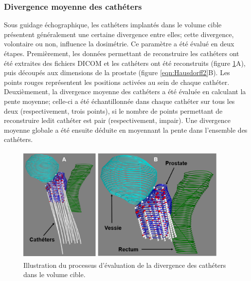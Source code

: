 \subsubsection{Divergence moyenne des cathéters}
Sous guidage échographique, les cathéters implantés dans le volume cible présentent généralement une certaine divergence entre elles; cette divergence, volontaire ou non, influence la dosimétrie. Ce paramètre a été évalué en deux étapes. Premièrement, les données permettant de reconstruire les cathéters ont été extraites des fichiers DICOM et les cathéters ont été reconstruits (figure \ref{Catheters}A), puis découpés aux dimensions de la prostate (figure \ref{eqn:Hausdorff2}B). Les points rouges représentent les positions activées au sein de chaque cathéter. Deuxièmement, la divergence moyenne des cathéters a été évaluée en calculant la pente moyenne; celle-ci a été échantillonnée dans chaque cathéter sur tous les deux (respectivement, trois points), si le nombre de points permettant de reconstruire ledit cathéter est pair (respectivement, impair). Une divergence moyenne globale a été ensuite déduite en moyennant la pente dans l'ensemble des cathéters.
%
\begin{figure}[ht!]
\centering
\includegraphics[width=10.5cm,height=5.8cm]{Catheters}
\caption{\label{Catheters} Illustration du processus d'évaluation de la divergence des cathéters dans le volume cible.}
\end{figure}
%

